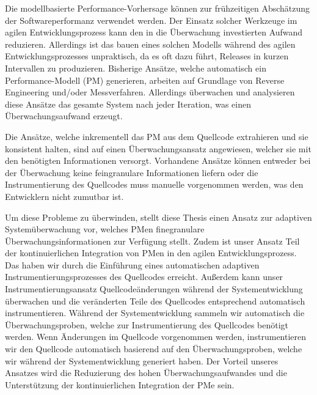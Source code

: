 \Abstract
 
Die modellbasierte Performance-Vorhersage können zur frühzeitigen Abschätzung der	
Softwareperformanz verwendet werden. Der Einsatz solcher Werkzeuge	im	agilen	
Entwicklungsprozess	kann	den	in	die	Überwachung	investierten	Aufwand	reduzieren.	
Allerdings	ist	das	bauen	eines	solchen	Modells	während	des	agilen	Entwicklungsprozesses	
unpraktisch,	da	es	oft	dazu	führt,	Releases	in	kurzen	Intervallen	zu	produzieren.	Bisherige	
Ansätze,	welche	automatisch	ein	Performance-Modell	(PM)	generieren,	arbeiten	auf	
Grundlage	von	Reverse	Engineering	und/oder	Messverfahren.	Allerdings	überwachen	und	
analysieren	diese	Ansätze	das	gesamte	System	nach	jeder	Iteration,	was	einen	
Überwachungsaufwand	erzeugt.

Die	Ansätze,	welche	inkrementell	das	PM	aus	dem	Quellcode	extrahieren	und	sie	konsistent	
halten,	sind	auf	einen	Überwachungsansatz	angewiesen,	welcher	sie	mit	den	benötigten	
Informationen	versorgt.	Vorhandene	Ansätze	können	entweder	bei	der	Überwachung	keine	
feingranulare	Informationen	liefern	oder	die	Instrumentierung	des	Quellcodes	muss	
manuelle	vorgenommen	werden,	was	den	Entwicklern	nicht	zumutbar	ist.

Um	diese	Probleme	zu	überwinden,	stellt	diese	Thesis	einen	Ansatz	zur	adaptiven	
Systemüberwachung	vor,	welches	PMen	finegranulare	Überwachungsinformationen	zur	
Verfügung	stellt.	Zudem	ist	unser	Ansatz	Teil	der	kontinuierlichen	Integration	von	PMen	in	
den	agilen	Entwicklungsprozess.	Das	haben	wir	durch	die	Einführung	eines	automatischen	
adaptiven	Instrumentierungsprozesses	des	Quellcodes	erreicht.	Außerdem	kann	unser	
Instrumentierungsansatz	Quellcodeänderungen	während	der	Systementwicklung	
überwachen	und	die	veränderten	Teile	des	Quellcodes	entsprechend	automatisch	
instrumentieren.	Während	der	Systementwicklung	sammeln	wir	automatisch	die	
Überwachungsproben,	welche	zur	Instrumentierung	des	Quellcodes	benötigt	werden.	Wenn	
Änderungen	im	Quellcode	vorgenommen	werden,	instrumentieren	wir	den	Quellcode	
automatisch	basierend	auf	den	Überwachungsproben,	welche	wir	während	der	
Systementwicklung	generiert	haben.	Der	Vorteil	unseres	Ansatzes	wird	die Reduzierung	des	
hohen	Überwachungsaufwandes	und	die	Unterstützung	der	kontinuierlichen	Integration	der	
PMe	sein.

